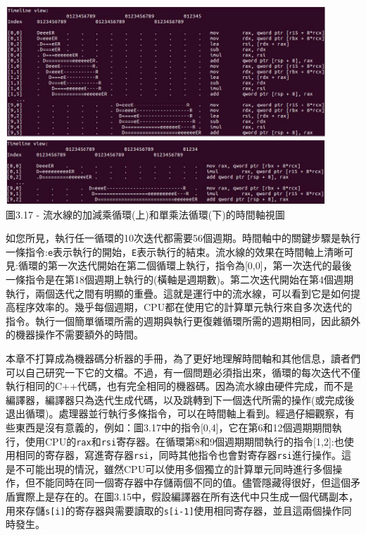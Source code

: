 \begin{center}
\includegraphics[width=0.9\textwidth]{content/1/chapter3/images/17.jpg}\\
圖3.17 - 流水線的加減乘循環(上)和單乘法循環(下)的時間軸視圖
\end{center}

如您所見，執行任一循環的10次迭代都需要56個週期。時間軸中的關鍵步驟是執行一條指令:\texttt{e}表示執行的開始，\texttt{E}表示執行的結束。流水線的效果在時間軸上清晰可見:循環的第一次迭代開始在第二個循環上執行，指令為[0,0]，第一次迭代的最後一條指令是在第18個週期上執行的(橫軸是週期數)。第二次迭代開始在第4個週期執行，兩個迭代之間有明顯的重疊。這就是運行中的流水線，可以看到它是如何提高程序效率的。幾乎每個週期，CPU都在使用它的計算單元執行來自多次迭代的指令。執行一個簡單循環所需的週期與執行更復雜循環所需的週期相同，因此額外的機器操作不需要額外的時間。

本章不打算成為機器碼分析器的手冊，為了更好地理解時間軸和其他信息，讀者們可以自己研究一下它的文檔。不過，有一個問題必須指出來，循環的每次迭代不僅執行相同的C++代碼，也有完全相同的機器碼。因為流水線由硬件完成，而不是編譯器，編譯器只為迭代生成代碼，以及跳轉到下一個迭代所需的操作(或完成後退出循環)。處理器並行執行多條指令，可以在時間軸上看到。經過仔細觀察，有些東西是沒有意義的，例如：圖3.17中的指令[0,4]，它在第6和12個週期期間執行，使用CPU的\texttt{rax}和\texttt{rsi}寄存器。在循環第8和9個週期期間執行的指令[1,2]:也使用相同的寄存器，寫進寄存器\texttt{rsi}，同時其他指令也會對寄存器\texttt{rsi}進行操作。這是不可能出現的情況，雖然CPU可以使用多個獨立的計算單元同時進行多個操作，但不能同時在同一個寄存器中存儲兩個不同的值。儘管隱藏得很好，但這個矛盾實際上是存在的。在圖3.15中，假設編譯器在所有迭代中只生成一個代碼副本，用來存儲\texttt{s[i]}的寄存器與需要讀取的\texttt{s[i-1]}使用相同寄存器，並且這兩個操作同時發生。

